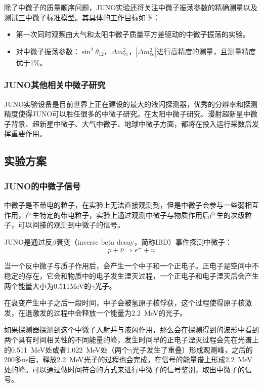 \documentclass[10pt,a4paper]{article}
\begin{document}
除了中微子的质量顺序问题，JUNO实验还将关注中微子振荡参数的精确测量以及测试三中微子标准模型。其具体的工作目标如下\cite{2009Experimental}：

\begin{itemize}
	\item{第一次同时观察由大气和太阳中微子质量平方差驱动的中微子振荡的实验。}
    
    \item{对中微子振荡参数：$\sin^2{\theta_{12}}$，$\Delta m^2_{21}$，$|\Delta m^2_{ee}|$进行高精度的测量，且测量精度优于1\%。}
\end{itemize}


\subsubsection{JUNO其他相关中微子研究}

JUNO实验设备是目前世界上正在建设的最大的液闪探测器，优秀的分辨率和探测精度使得JUNO可以胜任很多的中微子研究。在太阳中微子研究、漫射超新星中微子背景、超新星中微子、大气中微子、地球中微子方面，都将在投入运行采数后发挥重要作用。

\subsection{实验方案}\label{sub:2}

\subsubsection{JUNO的中微子信号}\label{sub:3}

中微子是不带电的粒子，在实验上无法直接观测到，但是中微子会参与一些弱相互作用，产生特定的带电粒子，实验上通过观测中微子与物质作用后产生的次级粒子，可以间接的观测到中微子的信号。

JUNO是通过反$\beta$衰变（inverse beta decay，简称IBD）事件探测中微子：$$p+\bar{\nu}\Rightarrow e^{+}+n$$

当一个反中微子与质子作用后，会产生一个中子和一个正电子。正电子是空间中不稳定的存在，它会和物质中的电子发生湮灭过程，一个正电子和电子湮灭后会产生两个能量大小为0.511MeV的$\gamma$光子。

在衰变产生中子之后一段时间，中子会被氢原子核俘获，这个过程使得原子核激发，在退激发的过程中会释放一个能量为\SI{2.2}{MeV}的光子。


如果探测器探测到这个中微子入射并与液闪作用，那么会在探测得到的波形中看到两个具有时间相关性的不同能量的峰，发生时间早的正电子湮灭过程会先在光谱上的\SI{0.511}{MeV}处或者\SI{1.022}{MeV}处（两个$\gamma$光子发生了重叠）形成观测峰，之后的200多ns后，释放\SI{2.2}{MeV}光子的过程也会完成，在信号的能量谱上形成\SI{2.2}{MeV}处的峰。可以通过做时间符合的方式来进行中微子的信号鉴别，取出中微子的信号。
\end{document}
